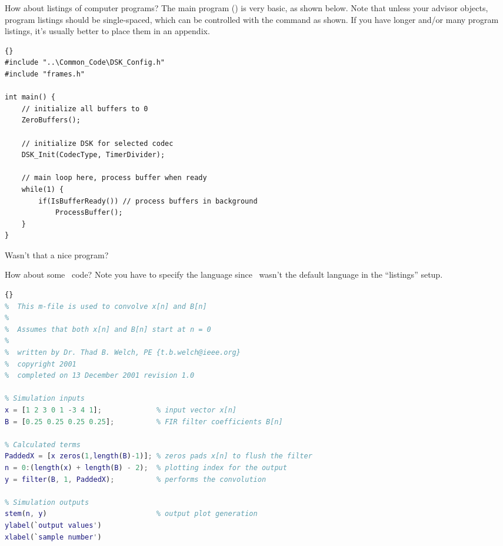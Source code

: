 How about listings of computer programs? The main program
() is very basic, as shown below. Note that unless your
advisor objects, program listings should be single-spaced, which
can be controlled with the \pc{\spacing} command as shown.  If you 
have longer and/or many program listings, it's usually better to 
place them in an appendix.

\begin{spacing}{1}
\begin{lstlisting}[caption={Main program for simple frame-based processing
  using ISRs.},label={cd:FrameMain_isr}]{}
#include "..\Common_Code\DSK_Config.h" 
#include "frames.h"

int main() {
    // initialize all buffers to 0
    ZeroBuffers();

    // initialize DSK for selected codec
    DSK_Init(CodecType, TimerDivider);

    // main loop here, process buffer when ready
    while(1) {
        if(IsBufferReady()) // process buffers in background
            ProcessBuffer();
    }
}
\end{lstlisting}
\end{spacing}
\noindent Wasn't that a nice program?  %

How about some \ml\ code? Note you have to specify the language
since \ml\ wasn't the default language in the ``listings'' setup.

\begin{spacing}{1}
\begin{lstlisting}[language=matlab,%
caption={Simple \ml\ FIR filter example.}]{}
%  This m-file is used to convolve x[n] and B[n]
%
%  Assumes that both x[n] and B[n] start at n = 0
%
%  written by Dr. Thad B. Welch, PE {t.b.welch@ieee.org}
%  copyright 2001
%  completed on 13 December 2001 revision 1.0

% Simulation inputs
x = [1 2 3 0 1 -3 4 1];             % input vector x[n]
B = [0.25 0.25 0.25 0.25];          % FIR filter coefficients B[n]

% Calculated terms
PaddedX = [x zeros(1,length(B)-1)]; % zeros pads x[n] to flush the filter
n = 0:(length(x) + length(B) - 2);  % plotting index for the output
y = filter(B, 1, PaddedX);          % performs the convolution

% Simulation outputs
stem(n, y)                          % output plot generation
ylabel(`output values')
xlabel(`sample number')
\end{lstlisting}
\end{spacing}

